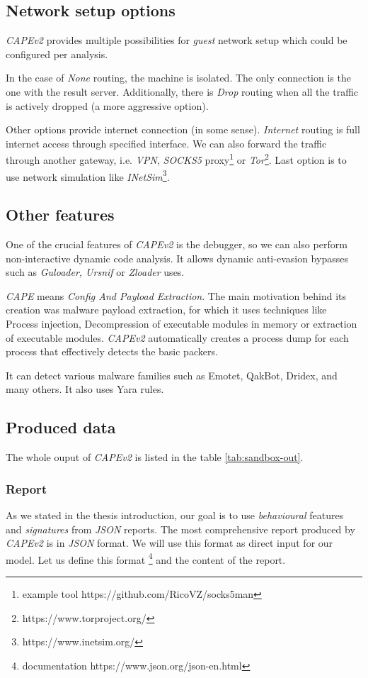 \subsection{Network setup options}
\emph{CAPEv2} provides multiple possibilities for \emph{guest} network setup which could be configured per analysis. 

In the case of \emph{None} routing, the machine is isolated. The only connection is the one with the result server. Additionally, there is \emph{Drop} routing when all the traffic is actively dropped (a more aggressive option). 

Other options provide internet connection (in some sense). \emph{Internet} routing is full internet access through specified interface. We can also forward the traffic through another gateway, i.e. \emph{VPN}, \emph{SOCKS5} proxy\footnote{example tool https://github.com/RicoVZ/socks5man} or \emph{Tor}\footnote{https://www.torproject.org/}. Last option is to use network simulation like \emph{INetSim}\footnote{https://www.inetsim.org/}.

\subsection{Other features}
One of the crucial features of \emph{CAPEv2} is the debugger, so we can also perform non-interactive dynamic code analysis. It allows dynamic anti-evasion bypasses such as \emph{Guloader, Ursnif} or \emph{Zloader} uses.

\emph{CAPE} means \emph{Config And Payload Extraction}. The main motivation behind its creation was malware payload extraction, for which it uses techniques like Process injection, Decompression of executable modules in memory or extraction of executable modules. \emph{CAPEv2} automatically creates a process dump for each process that effectively detects the basic packers.

It can detect various malware families such as Emotet, QakBot, Dridex, and many others. It also uses Yara rules.

\subsection{Produced data}
The whole ouput of \emph{CAPEv2} is listed in the table \ref{tab:sandbox-out}.


\subsubsection{Report}
As we stated in the thesis introduction, our goal is to use \emph{behavioural} features and \emph{signatures} from \emph{JSON} reports.  The most comprehensive report produced by \emph{CAPEv2} is in \emph{JSON} format. We will use this format as direct input for our model. Let us define this format \footnote{documentation https://www.json.org/json-en.html} and the content of the report.

